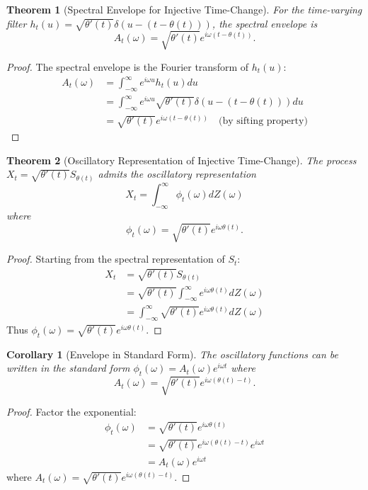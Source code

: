 \documentclass{article}
\newtheorem{theorem}{Theorem}
\newtheorem{corollary}{Corollary}
\begin{document}
\begin{theorem}[Spectral Envelope for Injective Time-Change]
For the time-varying filter $h_t(u) = \sqrt{\theta'(t)} \delta(u - (t - \theta(t)))$, the spectral envelope is
\[
A_t(\omega) = \sqrt{\theta'(t)} e^{i\omega(t - \theta(t))}.
\]
\end{theorem}

\begin{proof}
The spectral envelope is the Fourier transform of $h_t(u)$:
\begin{align}
A_t(\omega) &= \int_{-\infty}^\infty e^{i\omega u} h_t(u) du \\
&= \int_{-\infty}^\infty e^{i\omega u} \sqrt{\theta'(t)} \delta(u - (t - \theta(t))) du \\
&= \sqrt{\theta'(t)} e^{i\omega(t - \theta(t))} \quad \text{(by sifting property)}
\end{align}
\end{proof}

\begin{theorem}[Oscillatory Representation of Injective Time-Change]
The process $X_t = \sqrt{\theta'(t)} S_{\theta(t)}$ admits the oscillatory representation
\[
X_t = \int_{-\infty}^\infty \phi_t(\omega) dZ(\omega)
\]
where
\[
\phi_t(\omega) = \sqrt{\theta'(t)} e^{i\omega\theta(t)}.
\]
\end{theorem}

\begin{proof}
Starting from the spectral representation of $S_t$:
\begin{align}
X_t &= \sqrt{\theta'(t)} S_{\theta(t)} \\
&= \sqrt{\theta'(t)} \int_{-\infty}^\infty e^{i\omega\theta(t)} dZ(\omega) \\
&= \int_{-\infty}^\infty \sqrt{\theta'(t)} e^{i\omega\theta(t)} dZ(\omega)
\end{align}
Thus $\phi_t(\omega) = \sqrt{\theta'(t)} e^{i\omega\theta(t)}$.
\end{proof}

\begin{corollary}[Envelope in Standard Form]
The oscillatory functions can be written in the standard form $\phi_t(\omega) = A_t(\omega) e^{i\omega t}$ where
\[
A_t(\omega) = \sqrt{\theta'(t)} e^{i\omega(\theta(t) - t)}.
\]
\end{corollary}

\begin{proof}
Factor the exponential:
\begin{align}
\phi_t(\omega) &= \sqrt{\theta'(t)} e^{i\omega\theta(t)} \\
&= \sqrt{\theta'(t)} e^{i\omega(\theta(t) - t)} e^{i\omega t} \\
&= A_t(\omega) e^{i\omega t}
\end{align}
where $A_t(\omega) = \sqrt{\theta'(t)} e^{i\omega(\theta(t) - t)}$.
\end{proof}
\end{document}
